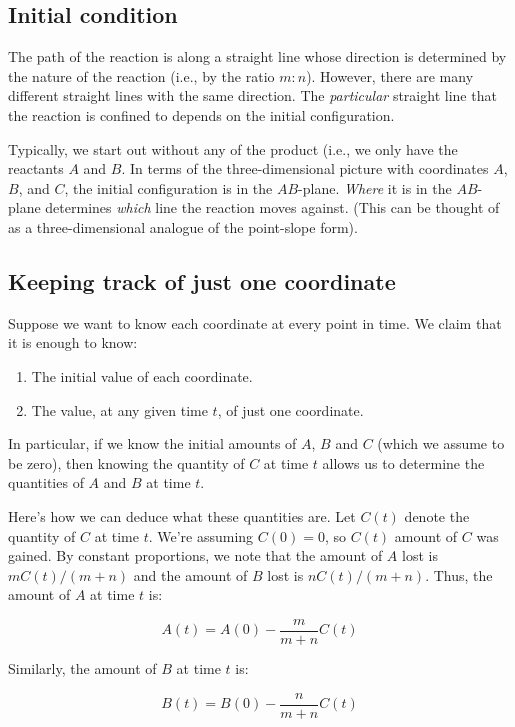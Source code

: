 \documentclass{amsart}
\begin{document}
\subsection{Initial condition}

The path of the reaction is along a straight line whose direction is
determined by the nature of the reaction (i.e., by the ratio
$m:n$). However, there are many different straight lines with the same
direction. The {\em particular} straight line that the reaction is
confined to depends on the initial configuration.

Typically, we start out without any of the product (i.e., we only have
the reactants $A$ and $B$. In terms of the three-dimensional picture
with coordinates $A$, $B$, and $C$, the initial configuration is in
the $AB$-plane. {\em Where} it is in the $AB$-plane determines {\em
which} line the reaction moves against. (This can be thought of as a
three-dimensional analogue of the point-slope form).

\subsection{Keeping track of just one coordinate}

Suppose we want to know each coordinate at every point in time. We
claim that it is enough to know:

\begin{enumerate}
\item The initial value of each coordinate.
\item The value, at any given time $t$, of just one coordinate.
\end{enumerate}

In particular, if we know the initial amounts of $A$, $B$ and $C$
(which we assume to be zero), then knowing the quantity of $C$ at time
$t$ allows us to determine the quantities of $A$ and $B$ at time
$t$.

Here's how we can deduce what these quantities are. Let $C(t)$ denote
the quantity of $C$ at time $t$. We're assuming $C(0) = 0$, so $C(t)$
amount of $C$ was gained. By constant proportions, we note that the
amount of $A$ lost is $mC(t)/(m + n)$ and the amount of $B$ lost is
$nC(t)/(m + n)$. Thus, the amount of $A$ at time $t$ is:

$$A(t) = A(0) - \frac{m}{m + n}C(t)$$

Similarly, the amount of $B$ at time $t$ is:

$$B(t) = B(0) - \frac{n}{m + n}C(t)$$
\end{document}
